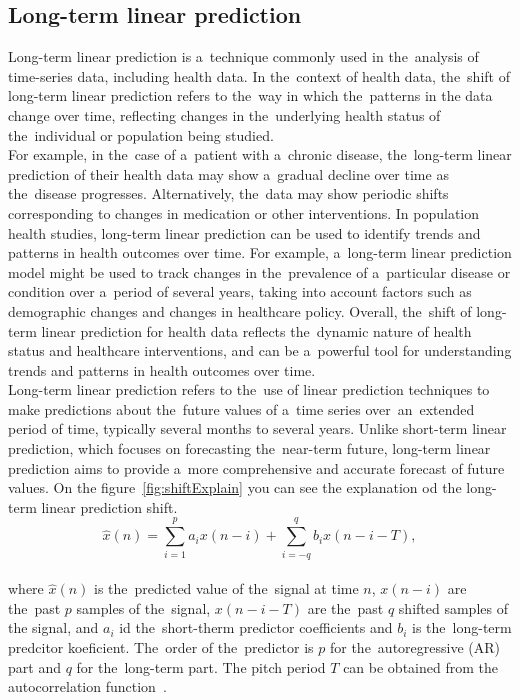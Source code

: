 \subsection{Long-term linear prediction}\label{subsec:longlp}
Long-term linear prediction is a~technique commonly used in the~analysis of time-series data, including health data.
In the~context of health data, the~shift of long-term linear prediction refers to the~way in which the~patterns in the
data change over time, reflecting changes in the~underlying health status of the~individual or population being studied.\\
For example, in the~case of a~patient with a~chronic disease, the~long-term linear prediction of their health data may
show a~gradual decline over time as the~disease progresses. Alternatively, the~data may show periodic shifts
corresponding to changes in medication or other interventions. In population health studies, long-term linear
prediction can be used to identify trends and patterns in health outcomes over time. For example, a~long-term linear
prediction model might be used to track changes in the~prevalence of a~particular disease or condition
over a~period of several years, taking into account factors such as demographic changes and changes in healthcare policy.
Overall, the~shift of long-term linear prediction for health data reflects the~dynamic nature of health status and
healthcare interventions, and can be a~powerful tool for understanding trends and patterns in health outcomes over time.
\\
Long-term linear prediction refers to the~use of linear prediction techniques to make predictions about the~future
values of a~time series over~an~extended period of time, typically several months to several years. Unlike short-term
linear prediction, which focuses on forecasting the~near-term future, long-term linear prediction aims to provide a~more
comprehensive and accurate forecast of future values. On the figure~\ref{fig:shiftExplain} you can see the explanation od the long-term linear prediction shift.\\
\begin{equation}\label{eq:ltlp}
    \hat{x}(n) = \sum_{i=1}^{p} a_i x(n-i) + \sum_{i=-q}^{q} b_i x(n-i-T),
\end{equation}
\\
where $\hat{x}(n)$ is the~predicted value of the~signal at time $n$, $x(n-i)$ are the~past $p$ samples of the~signal, $x(n-i-T)$ are the~past $q$ shifted samples of the signal, and $a_i$ id the~short-therm predictor coefficients and $b_i$ is the~long-term predcitor koeficient. The~order of the~predictor is $p$ for the~autoregressive (AR) part and $q$ for the~long-term part. The pitch period $T$ can be obtained from the autocorrelation function~\cite{vaseghi2008advanced}.\\
